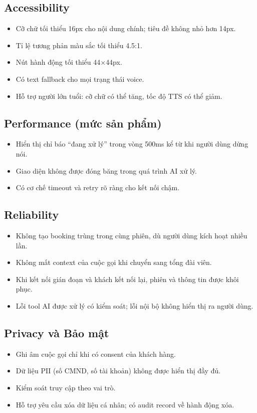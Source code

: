 \documentclass[12pt,a4paper]{article}
\begin{document}
\subsection{Accessibility}
\begin{itemize}
  \item Cỡ chữ tối thiểu 16px cho nội dung chính; tiêu đề không nhỏ hơn 14px.
  \item Tỉ lệ tương phản màu sắc tối thiểu 4.5:1.
  \item Nút hành động tối thiểu 44$\times$44px.
  \item Có text fallback cho mọi trạng thái voice.
  \item Hỗ trợ người lớn tuổi: cỡ chữ có thể tăng, tốc độ TTS có thể giảm.
\end{itemize}

\subsection{Performance (mức sản phẩm)}
\begin{itemize}
  \item Hiển thị chỉ báo ``đang xử lý'' trong vòng 500ms kể từ khi người dùng dừng nói.
  \item Giao diện không được đóng băng trong quá trình AI xử lý.
  \item Có cơ chế timeout và retry rõ ràng cho kết nối chậm.
\end{itemize}

\subsection{Reliability}
\begin{itemize}
  \item Không tạo booking trùng trong cùng phiên, dù người dùng kích hoạt nhiều lần.
  \item Không mất context của cuộc gọi khi chuyển sang tổng đài viên.
  \item Khi kết nối gián đoạn và khách kết nối lại, phiên và thông tin được khôi phục.
  \item Lỗi tool AI được xử lý có kiểm soát; lỗi nội bộ không hiển thị ra người dùng.
\end{itemize}

\subsection{Privacy và Bảo mật}
\begin{itemize}
  \item Ghi âm cuộc gọi chỉ khi có consent của khách hàng.
  \item Dữ liệu PII (số CMND, số tài khoản) không được hiển thị đầy đủ.
  \item Kiểm soát truy cập theo vai trò.
  \item Hỗ trợ yêu cầu xóa dữ liệu cá nhân; có audit record về hành động xóa.
\end{itemize}
\end{document}
